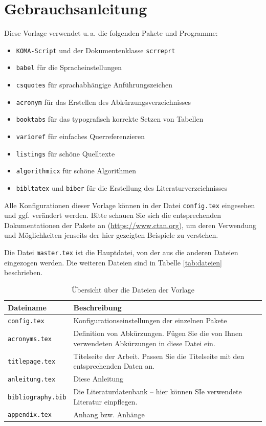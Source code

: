 \chapter{Gebrauchsanleitung}
Diese Vorlage verwendet u.\,a. die folgenden Pakete und Programme: 
\begin{itemize}
	\item\texttt{KOMA-Script} und der Dokumentenklasse \texttt{scrreprt}
	\item \texttt{babel} für die Spracheinstellungen
	\item \texttt{csquotes} für sprachabhängige Anführungszeichen 
	\item \texttt{acronym} für das Erstellen des Abkürzungsverzeichnisses 
	\item \texttt{booktabs} für das typografisch korrekte Setzen von Tabellen 
	\item \texttt{varioref} für einfaches Querreferenzieren 
	\item \texttt{listings} für schöne Quelltexte
	\item \texttt{algorithmicx} für schöne Algorithmen
	\item \texttt{bibltatex} und \texttt{biber} für die Erstellung des Literaturverzeichnisses 
\end{itemize}
Alle Konfigurationen dieser Vorlage können in der Datei \texttt{config.tex} eingesehen und ggf. verändert werden. Bitte schauen Sie sich die entsprechenden Dokumentationen 
der Pakete an (\url{https://www.ctan.org}), um deren Verwendung und Möglichkeiten jenseits der hier gezeigten Beispiele zu verstehen.

Die Datei \texttt{master.tex} ist die Hauptdatei, von der aus die anderen Dateien eingezogen werden. Die weiteren Dateien sind in Tabelle \vref{tab:dateien} beschrieben.
 
\begin{table}
	\centering
\begin{tabular}{lp{10cm}}
	\textbf{Dateiname} & \textbf{Beschreibung}\\\toprule
	\texttt{config.tex} & Konfigurationseinstellungen der einzelnen Pakete\\
	\texttt{acronyms.tex} & Definition von Abkürzungen. Fügen Sie die von Ihnen verwendeten Abkürzungen in diese Datei ein.\\
	\texttt{titlepage.tex} & Titelseite der Arbeit. Passen Sie die Titelseite mit den entsprechenden Daten an.\\
	\texttt{anleitung.tex} & Diese Anleitung\\ 
	\texttt{bibliography.bib}&  Die Literaturdatenbank -- hier können SIe verwendete Literatur einpflegen.\\
	\texttt{appendix.tex} & Anhang bzw. Anhänge \\\bottomrule
\end{tabular}
\caption{\label{tab:dateien}Übersicht über die Dateien der Vorlage}
\end{table}

